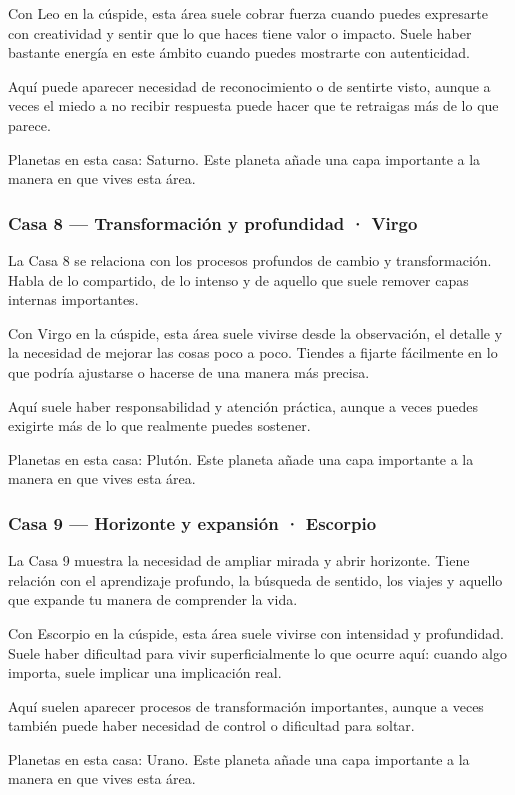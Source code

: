 \documentclass[11pt,a4paper]{article}
\begin{document}
Con Leo en la cúspide, esta área suele cobrar fuerza cuando puedes expresarte con creatividad y sentir que lo que haces tiene valor o impacto. Suele haber bastante energía en este ámbito cuando puedes mostrarte con autenticidad.

Aquí puede aparecer necesidad de reconocimiento o de sentirte visto, aunque a veces el miedo a no recibir respuesta puede hacer que te retraigas más de lo que parece.

Planetas en esta casa: Saturno. Este planeta añade una capa importante a la manera en que vives esta área.

\subsubsection*{Casa 8 — Transformación y profundidad · Virgo}
La Casa 8 se relaciona con los procesos profundos de cambio y transformación. Habla de lo compartido, de lo intenso y de aquello que suele remover capas internas importantes.

Con Virgo en la cúspide, esta área suele vivirse desde la observación, el detalle y la necesidad de mejorar las cosas poco a poco. Tiendes a fijarte fácilmente en lo que podría ajustarse o hacerse de una manera más precisa.

Aquí suele haber responsabilidad y atención práctica, aunque a veces puedes exigirte más de lo que realmente puedes sostener.

Planetas en esta casa: Plutón. Este planeta añade una capa importante a la manera en que vives esta área.

\subsubsection*{Casa 9 — Horizonte y expansión · Escorpio}
La Casa 9 muestra la necesidad de ampliar mirada y abrir horizonte. Tiene relación con el aprendizaje profundo, la búsqueda de sentido, los viajes y aquello que expande tu manera de comprender la vida.

Con Escorpio en la cúspide, esta área suele vivirse con intensidad y profundidad. Suele haber dificultad para vivir superficialmente lo que ocurre aquí: cuando algo importa, suele implicar una implicación real.

Aquí suelen aparecer procesos de transformación importantes, aunque a veces también puede haber necesidad de control o dificultad para soltar.

Planetas en esta casa: Urano. Este planeta añade una capa importante a la manera en que vives esta área.
\end{document}
